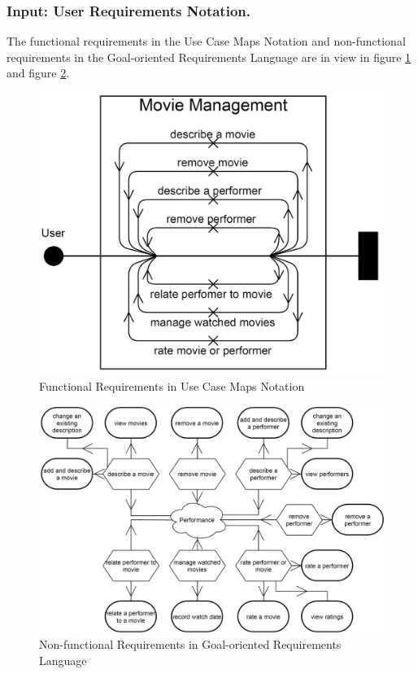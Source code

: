 \subsubsection{Input: User Requirements Notation.}
The functional requirements in the Use Case Maps Notation and non-functional requirements in the Goal-oriented Requirements Language are in view in figure \ref{fig:08_UCMMovieManagement} and figure \ref{fig:08_GRLMovieManagement}.
\begin{figure}[h]
	\centering
	\includegraphics[scale=0.29]{../images/08/08_UCMMovieManagement.jpg} 
	\caption{Functional Requirements in Use Case Maps Notation}
	\label{fig:08_UCMMovieManagement}
\end{figure}
\begin{figure}[h]
	\centering
	\includegraphics[scale=0.4]{../images/08/08_GRLMovieManagement.jpg} 
	\caption{Non-functional Requirements in Goal-oriented Requirements Language}
	\label{fig:08_GRLMovieManagement}
\end{figure}

